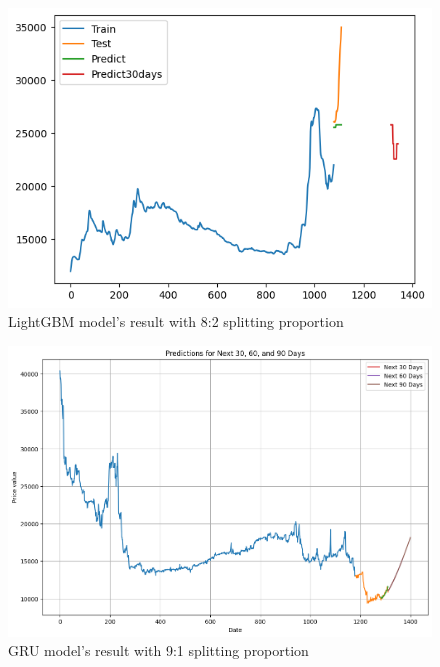 \documentclass{ieeeojies}
\begin{document}
\vspace{-1em}

\begin{figure}[H]
  \centering
  \begin{minipage}{0.8\linewidth}
    \centering
    \includegraphics[width=\linewidth]{bibliography/Figure/LightGBM_DHT(8_2).png}
    \caption{LightGBM model's result with 8:2 splitting proportion}
    \label{fig8}
  \end{minipage}
\end{figure}

\vspace{-1em}

\begin{figure}[H]
  \centering
  \begin{minipage}{0.8\linewidth}
    \centering
    \includegraphics[width=\linewidth]{bibliography/Figure/DHT_GRU.png}
    \caption{GRU model's result with 9:1 splitting proportion}
    \label{fig8}
  \end{minipage}
\end{figure}
\end{document}
